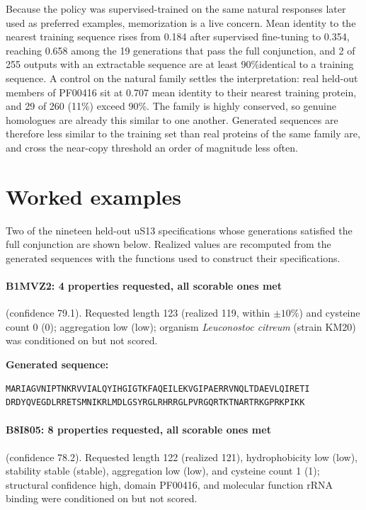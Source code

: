 \documentclass{article}
\newcommand{\pct}{\%}
\begin{document}
Because the policy was supervised-trained on the same natural responses later used as preferred examples, memorization is a live concern. Mean identity to the nearest training sequence rises from 0.184 after supervised fine-tuning to 0.354, reaching 0.658 among the 19 generations that pass the full conjunction, and 2 of 255 outputs with an extractable sequence are at least 90\pct identical to a training sequence. A control on the natural family settles the interpretation: real held-out members of PF00416 sit at 0.707 mean identity to their nearest training protein, and 29 of 260 (11\pct) exceed 90\pct. The family is highly conserved, so genuine homologues are already this similar to one another. Generated sequences are therefore less similar to the training set than real proteins of the same family are, and cross the near-copy threshold an order of magnitude less often.

\section{Worked examples}\label{app:examples}
Two of the nineteen held-out uS13 specifications whose generations satisfied
the full conjunction are shown below. Realized values are recomputed from the generated
sequences with the functions used to construct their specifications.

\paragraph{B1MVZ2: 4 properties requested, all scorable ones met} (confidence 79.1).
Requested length 123 (realized 119, within $\pm10\pct{}$) and cysteine count 0
(0); aggregation low (low); organism \emph{Leuconostoc citreum} (strain KM20)
was conditioned on but not scored.

\medskip
\noindent\textbf{Generated sequence:}
\begin{small}
\begin{verbatim}
MARIAGVNIPTNKRVVIALQYIHGIGTKFAQEILEKVGIPAERRVNQLTDAEVLQIRETI
DRDYQVEGDLRRETSMNIKRLMDLGSYRGLRHRRGLPVRGQRTKTNARTRKGPRKPIKK
\end{verbatim}
\end{small}

\paragraph{B8I805: 8 properties requested, all scorable ones met} (confidence 78.2).
Requested length 122 (realized 121), hydrophobicity low (low), stability stable
(stable), aggregation low (low), and cysteine count 1 (1); structural
confidence high, domain PF00416, and molecular function rRNA binding were
conditioned on but not scored.
\end{document}
